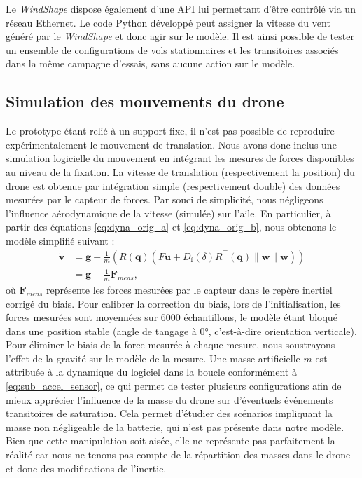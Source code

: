 
Le \textit{WindShape} dispose également d'une API lui permettant d'être contrôlé via un réseau Ethernet. Le code Python développé peut assigner la vitesse du vent généré par le \textit{WindShape} et donc agir sur le modèle. Il est ainsi possible de tester un ensemble de configurations de vols stationnaires et les transitoires associés dans la même campagne d'essais, sans aucune action sur le modèle. 


\subsection{Simulation des mouvements du drone}
Le prototype étant relié à un support fixe, il n'est pas possible de reproduire expérimentalement le mouvement de translation.  Nous avons donc inclus une simulation logicielle du mouvement en intégrant les mesures de forces disponibles au niveau de la fixation. La vitesse de translation (respectivement la position) du drone est obtenue par intégration simple (respectivement double) des données mesurées par le capteur de forces. Par souci de simplicité, nous négligeons l'influence aérodynamique de la vitesse (simulée) sur l'aile. En particulier, à partir des équations \eqref{eq:dyna_orig_a} et \eqref{eq:dyna_orig_b}, nous obtenons le modèle simplifié suivant : 
\begin{subequations}\label{eq:accel_sensor}
    \begin{align}
        \boldsymbol{\dot v} &= \boldsymbol{g} + \frac{1}{m}\left( R(\boldsymbol{q})(F\boldsymbol{u} +  D_{\text{f}}(\delta) R^\top(\boldsymbol{q})\lVert \boldsymbol{w} \rVert \boldsymbol{w}) \right)\\
        &= \boldsymbol{g} + \frac{1}{m} \boldsymbol{F}_{meas} \label{eq:sub_accel_sensor},
    \end{align}
\end{subequations}
où $\boldsymbol{F}_{meas}$ représente les forces mesurées par le capteur dans le repère inertiel corrigé du biais. Pour calibrer la correction du biais, lors de l'initialisation, les forces mesurées sont moyennées sur 6000 échantillons, le modèle étant bloqué dans une position stable (angle de tangage à 0°, c'est-à-dire orientation verticale). Pour éliminer le biais de la force mesurée à chaque mesure, nous soustrayons l'effet de la gravité sur le modèle de la mesure. Une masse artificielle $m$ est attribuée à la dynamique du logiciel dans la boucle conformément à \eqref{eq:sub_accel_sensor}, ce qui permet de tester plusieurs configurations afin de mieux apprécier l'influence de la masse du drone sur d'éventuels événements transitoires de saturation. Cela permet d'étudier des scénarios impliquant la masse non négligeable de la batterie, qui n'est pas présente dans notre modèle. Bien que cette manipulation soit aisée, elle ne représente pas parfaitement la réalité car nous ne tenons pas compte de la répartition des masses dans le drone et donc des modifications de l'inertie.

